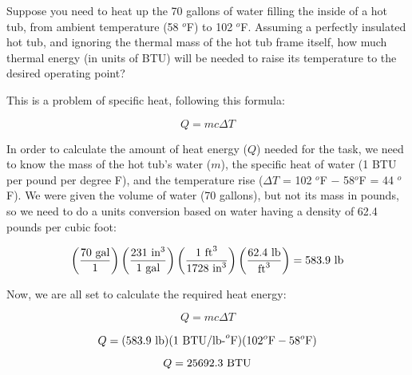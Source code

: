 

Suppose you need to heat up the 70 gallons of water filling the inside of a hot tub, from ambient temperature (58 $^{o}$F) to 102 $^{o}$F.  Assuming a perfectly insulated hot tub, and ignoring the thermal mass of the hot tub frame itself, how much thermal energy (in units of BTU) will be needed to raise its temperature to the desired operating point?







This is a problem of specific heat, following this formula:

$$Q = mc \Delta T$$

In order to calculate the amount of heat energy ($Q$) needed for the task, we need to know the mass of the hot tub's water ($m$), the specific heat of water (1 BTU per pound per degree F), and the temperature rise ($\Delta T$ = 102 $^{o}$F $-$ 58$^{o}$F = 44 $^{o}$F).  We were given the volume of water (70 gallons), but not its mass in pounds, so we need to do a units conversion based on water having a density of 62.4 pounds per cubic foot:

$$\left(70 \hbox{ gal} \over 1 \right) \left( 231 \hbox{ in}^3 \over 1 \hbox{ gal} \right) \left(1 \hbox{ ft}^3 \over 1728 \hbox{ in}^3 \right) \left( 62.4 \hbox{ lb} \over \hbox{ft}^3 \right) = 583.9 \hbox{ lb}$$

Now, we are all set to calculate the required heat energy:

$$Q = mc \Delta T$$

$$Q = (583.9 \hbox{ lb}) (1 \hbox{ BTU/lb-}^o\hbox{F}) (102^o\hbox{F} - 58^o\hbox{F})$$

$$Q = 25692.3 \hbox{ BTU}$$











